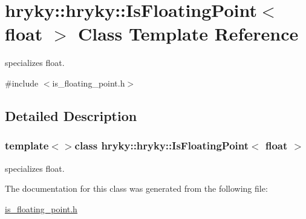 \hypertarget{classhryky_1_1hryky_1_1_is_floating_point_3_01float_01_4}{\section{hryky\-:\-:hryky\-:\-:Is\-Floating\-Point$<$ float $>$ Class Template Reference}
\label{classhryky_1_1hryky_1_1_is_floating_point_3_01float_01_4}
}


specializes float.  




{\ttfamily \#include $<$is\-\_\-floating\-\_\-point.\-h$>$}



\subsection{Detailed Description}
\subsubsection*{template$<$$>$class hryky\-::hryky\-::\-Is\-Floating\-Point$<$ float $>$}

specializes float. 

The documentation for this class was generated from the following file\-:\begin{DoxyCompactItemize}
\item 
\hyperlink{is__floating__point_8h}{is\-\_\-floating\-\_\-point.\-h}\end{DoxyCompactItemize}
